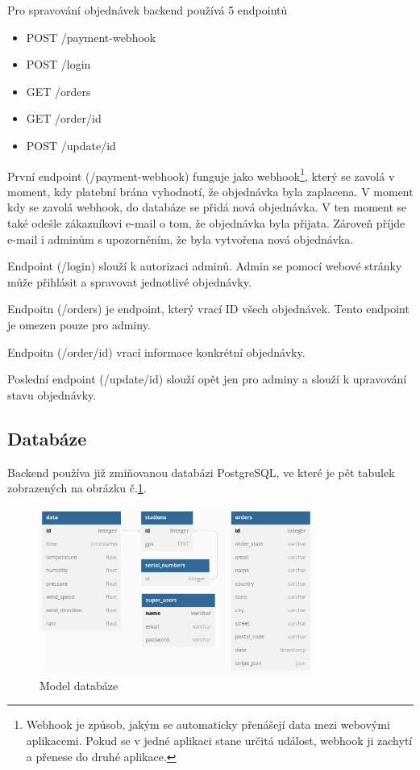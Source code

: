 Pro spravování objednávek backend používá 5 endpointů
\begin{itemize}
  \item POST /payment-webhook
  \item POST /login
  \item GET /orders
  \item GET /order/{id}
  \item POST /update/{id}
\end{itemize}
První endpoint (/payment-webhook) funguje jako webhook\footnote{Webhook je způsob, jakým se automaticky přenášejí data mezi webovými aplikacemi.
Pokud se v jedné aplikaci stane určitá událost, webhook ji zachytí a přenese do druhé aplikace.},
který se zavolá v moment, kdy platební brána vyhodnotí, že objednávka byla zaplacena. V moment kdy se zavolá webhook, do databáze se přidá nová objednávka. 
V ten moment se také odešle zákazníkovi e-mail o tom, že objednávka byla přijata. Zároveň příjde e-mail i adminům s upozorněním, že byla vytvořena nová objednávka.

Endpoint (/login) slouží k autorizaci adminů. Admin se pomocí webové stránky může přihlásit a spravovat jednotlivé objednávky.

Endpoitn (/orders) je endpoint, který vrací ID všech objednávek. Tento endpoint je omezen pouze pro adminy.

Endpoitn (/order/{id}) vrací informace konkrétní objednávky.

Poslední endpoint (/update/{id}) slouží opět jen pro adminy a slouží k upravování stavu objednávky.

\subsection{Databáze}
Backend používa již zmiňovanou databázi PostgreSQL, ve které je pět tabulek zobrazených na obrázku č.\ref{model_databaze}.
\begin{figure}[h] 
    \centering
    \includegraphics[width=0.8\textwidth]{images/database_diagram.png}
    \caption{Model databáze}
    \label{model_databaze}
\end{figure}
